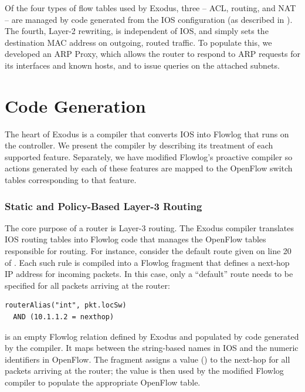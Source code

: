 Of the four types of flow tables used by Exodus, three -- ACL, routing,
and NAT -- are managed by code generated from the IOS configuration (as
described in ). The fourth, Layer-2 rewriting,
is independent of IOS, and simply sets the destination MAC address
on outgoing, routed traffic. To populate this, we developed an
ARP Proxy, which allows the router to respond to ARP requests
for its interfaces and known hosts, and to issue queries on the attached
subnets.

\section{Code Generation}
\label{sec:code-gen}

The heart of Exodus is a compiler that converts IOS into Flowlog that
runs on the controller.  We present the compiler by describing its
treatment of each supported feature.  Separately, we have modified
Flowlog's proactive compiler so actions generated by each of
these features are mapped to the OpenFlow switch tables
corresponding to that feature.

\subsubsection{Static and Policy-Based Layer-3 Routing}

The core purpose of a router is Layer-3 routing.
The Exodus compiler translates IOS routing tables into Flowlog code
that manages the OpenFlow tables responsible for routing. For instance,
consider the default route given on line 20 of .
Each such rule is compiled into a Flowlog fragment that defines a next-hop IP
address for incoming packets. In this case, only a ``default'' route
needs to be specified for all packets arriving at the 
router:
\begin{lstlisting}[label=lst:routing-flowlog,language=Flowlog]
routerAlias("int", pkt.locSw) 
  AND (10.1.1.2 = nexthop)
\end{lstlisting}

\noindent
{} is an empty Flowlog relation defined by Exodus and
populated by code generated by the compiler. It maps between the
string-based names in IOS and the numeric identifiers in
OpenFlow. The fragment assigns a value () to the next-hop
for all packets arriving at the  router; the value is then
used by the modified Flowlog compiler to populate the appropriate
OpenFlow table.

